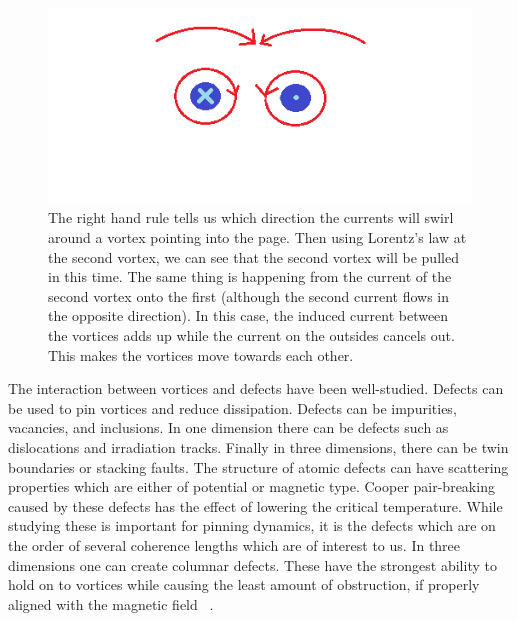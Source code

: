 \begin{figure}[htbp]
\begin{center}
\includegraphics[scale=.50]{oppositeDirection.png}
\caption{The right hand rule tells us which direction the currents will swirl around a vortex pointing into the page. Then using Lorentz's law  at the second vortex, we can see that the second vortex will be pulled in this time. The same thing is happening from the current of the second vortex onto the first (although the second current flows in the opposite direction). In this case, the induced current between the vortices adds up while the current on the outsides cancels out. This makes the vortices move towards each other.}
\label{diffV}
\end{center}
\end{figure}

The interaction between vortices and defects have been well-studied. Defects can be used to pin vortices and reduce dissipation. Defects can be impurities, vacancies, and inclusions. In one dimension there can be defects such as dislocations and irradiation tracks. Finally in three dimensions, there can be twin boundaries or stacking faults. The structure of atomic defects can have scattering properties which are either of potential or magnetic type. Cooper pair-breaking caused by these defects has the effect of lowering the critical temperature. While studying these is important for pinning dynamics, it is the defects which are on the order of several coherence lengths which are of interest to us. In three dimensions one can create columnar defects. These have the strongest ability to hold on to vortices while causing the least amount of obstruction, if properly aligned with the magnetic field ~\cite{Kwok16}.

